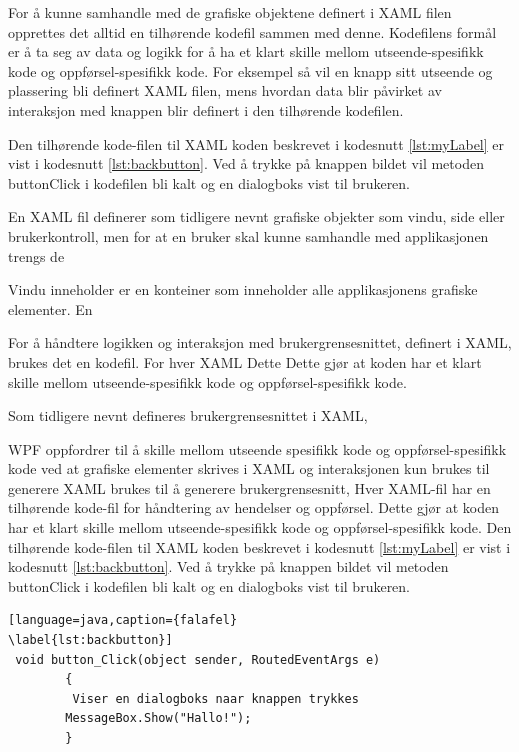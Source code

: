 \documentclass[phd,tocprelim]{cornell}
\begin{document}
For å kunne samhandle med de grafiske objektene definert i XAML filen opprettes det alltid en tilhørende kodefil sammen med denne. Kodefilens formål er å ta seg av data og logikk for å ha et klart skille mellom utseende-spesifikk kode og oppførsel-spesifikk kode. For eksempel så vil en knapp sitt utseende og plassering bli definert XAML filen, mens hvordan data blir påvirket av interaksjon med knappen blir definert i den tilhørende kodefilen.



Den tilhørende kode-filen til XAML koden beskrevet i kodesnutt \ref{lst:myLabel} er vist i kodesnutt \ref{lst:backbutton}. Ved å trykke på knappen bildet vil metoden button\textunderscore Click i kodefilen bli kalt og en dialogboks vist til brukeren.

En XAML fil definerer som tidligere nevnt grafiske objekter som vindu, side eller brukerkontroll, men for at en bruker skal kunne samhandle med applikasjonen trengs de


Vindu inneholder er en konteiner som inneholder alle applikasjonens grafiske elementer. En

For å håndtere logikken og interaksjon med brukergrensesnittet,  definert i XAML, brukes det en kodefil. For hver XAML   Dette Dette gjør at koden har et klart skille mellom utseende-spesifikk kode og oppførsel-spesifikk kode.

Som tidligere nevnt defineres brukergrensesnittet i XAML,

WPF oppfordrer til å skille mellom utseende spesifikk kode og oppførsel-spesifikk kode ved at grafiske elementer skrives i XAML og interaksjonen  kun brukes til generere 
XAML brukes til å generere brukergrensesnitt, 
Hver XAML-fil har en tilhørende kode-fil for håndtering av hendelser og oppførsel. Dette gjør at koden har et klart skille mellom utseende-spesifikk kode og oppførsel-spesifikk kode. Den tilhørende kode-filen til XAML koden beskrevet i kodesnutt \ref{lst:myLabel} er vist i kodesnutt \ref{lst:backbutton}. Ved å trykke på knappen bildet vil metoden button\textunderscore Click i kodefilen bli kalt og en dialogboks vist til brukeren.

\begin{lstlisting}[language=java,caption={falafel}
\label{lst:backbutton}]
 void button_Click(object sender, RoutedEventArgs e)
        {
         Viser en dialogboks naar knappen trykkes
        MessageBox.Show("Hallo!");
        }
\end{lstlisting}
\end{document}
